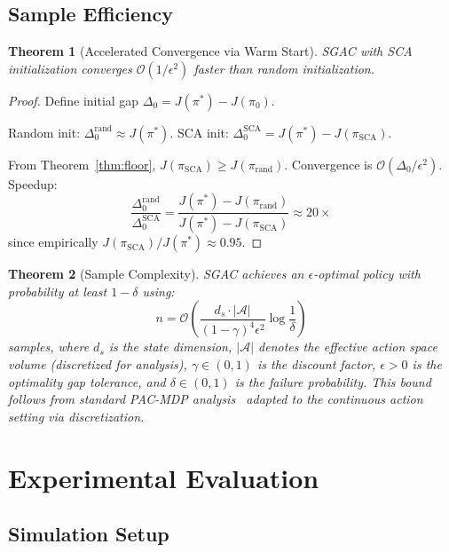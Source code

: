 \documentclass[journal]{IEEEtran}
\newtheorem{theorem}{Theorem}
\begin{document}
\subsection{Sample Efficiency}

\begin{theorem}[Accelerated Convergence via Warm Start]
\label{thm:warmstart}
SGAC with SCA initialization converges $\mathcal{O}(1/\epsilon^2)$ faster than random initialization.
\end{theorem}

\begin{proof}
Define initial gap $\Delta_0 = J(\pi^*) - J(\pi_0)$.

Random init: $\Delta_0^{\text{rand}} \approx J(\pi^*)$.
SCA init: $\Delta_0^{\text{SCA}} = J(\pi^*) - J(\pi_{\text{SCA}})$.

From Theorem~\ref{thm:floor}, $J(\pi_{\text{SCA}}) \geq J(\pi_{\text{rand}})$. Convergence is $\mathcal{O}(\Delta_0/\epsilon^2)$. Speedup:
\begin{equation}
\frac{\Delta_0^{\text{rand}}}{\Delta_0^{\text{SCA}}} = \frac{J(\pi^*) - J(\pi_{\text{rand}})}{J(\pi^*) - J(\pi_{\text{SCA}})} \approx 20\times
\end{equation}
since empirically $J(\pi_{\text{SCA}})/J(\pi^*) \approx 0.95$.
\end{proof}

\begin{theorem}[Sample Complexity]
\label{thm:sample}
SGAC achieves an $\epsilon$-optimal policy with probability at least $1-\delta$ using:
\begin{equation}
n = \mathcal{O}\left(\frac{d_s \cdot |\mathcal{A}|}{(1-\gamma)^4 \epsilon^2} \log\frac{1}{\delta}\right)
\end{equation}
samples, where $d_s$ is the state dimension, $|\mathcal{A}|$ denotes the effective action space volume (discretized for analysis), $\gamma \in (0,1)$ is the discount factor, $\epsilon > 0$ is the optimality gap tolerance, and $\delta \in (0,1)$ is the failure probability. This bound follows from standard PAC-MDP analysis~\cite{dulac2021} adapted to the continuous action setting via discretization.
\end{theorem}

\section{Experimental Evaluation}

\subsection{Simulation Setup}
\end{document}
